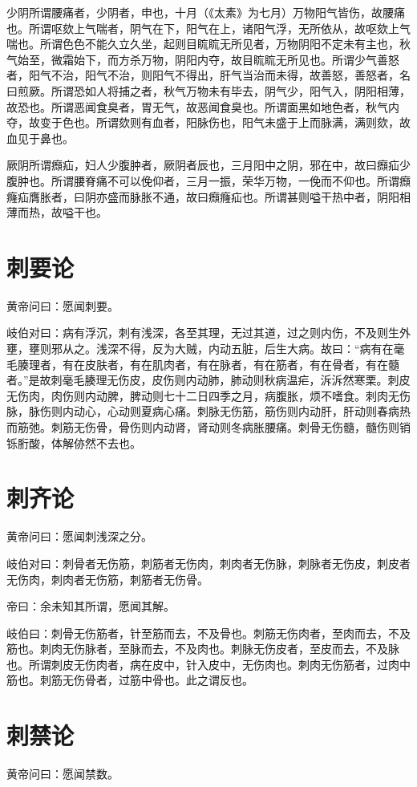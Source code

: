 \documentclass{article}%
\begin{document}
少阴所谓腰痛者，少阴者，申也，十月（《太素》为七月）万物阳气皆伤，故腰痛也。所谓呕欬上气喘者，阴气在下，阳气在上，诸阳气浮，无所依从，故呕欬上气喘也。所谓色色不能久立久坐，起则目䀮䀮无所见者，万物阴阳不定未有主也，秋气始至，微霜始下，而方杀万物，阴阳内夺，故目䀮䀮无所见也。所谓少气善怒者，阳气不治，阳气不治，则阳气不得出，肝气当治而未得，故善怒，善怒者，名曰煎厥。所谓恐如人将捕之者，秋气万物未有毕去，阴气少，阳气入，阴阳相薄，故恐也。所谓恶闻食臭者，胃无气，故恶闻食臭也。所谓面黑如地色者，秋气内夺，故变于色也。所谓欬则有血者，阳脉伤也，阳气未盛于上而脉满，满则欬，故血见于鼻也。

厥阴所谓㿗疝，妇人少腹肿者，厥阴者辰也，三月阳中之阴，邪在中，故曰㿗疝少腹肿也。所谓腰脊痛不可以俛仰者，三月一振，荣华万物，一俛而不仰也。所谓㿗癃疝膺胀者，曰阴亦盛而脉胀不通，故曰㿗癃疝也。所谓甚则嗌干热中者，阴阳相薄而热，故嗌干也。
\section{刺要论}
黄帝问曰：愿闻刺要。

岐伯对曰：病有浮沉，刺有浅深，各至其理，无过其道，过之则内伤，不及则生外壅，壅则邪从之。浅深不得，反为大贼，内动五脏，后生大病。故曰：“病有在毫毛腠理者，有在皮肤者，有在肌肉者，有在脉者，有在筋者，有在骨者，有在髓者。”是故刺毫毛腠理无伤皮，皮伤则内动肺，肺动则秋病温疟，泝泝然寒栗。刺皮无伤肉，肉伤则内动脾，脾动则七十二日四季之月，病腹胀，烦不嗜食。刺肉无伤脉，脉伤则内动心，心动则夏病心痛。刺脉无伤筋，筋伤则内动肝，肝动则春病热而筋弛。刺筋无伤骨，骨伤则内动肾，肾动则冬病胀腰痛。刺骨无伤髓，髓伤则销铄胻酸，体解㑊然不去也。
\section{刺齐论}
黄帝问曰：愿闻刺浅深之分。

岐伯对曰：刺骨者无伤筋，刺筋者无伤肉，刺肉者无伤脉，刺脉者无伤皮，刺皮者无伤肉，刺肉者无伤筋，刺筋者无伤骨。

帝曰：余未知其所谓，愿闻其解。

岐伯曰：刺骨无伤筋者，针至筋而去，不及骨也。刺筋无伤肉者，至肉而去，不及筋也。刺肉无伤脉者，至脉而去，不及肉也。刺脉无伤皮者，至皮而去，不及脉也。所谓刺皮无伤肉者，病在皮中，针入皮中，无伤肉也。刺肉无伤筋者，过肉中筋也。刺筋无伤骨者，过筋中骨也。此之谓反也。
\section{刺禁论}
黄帝问曰：愿闻禁数。
\end{document}

